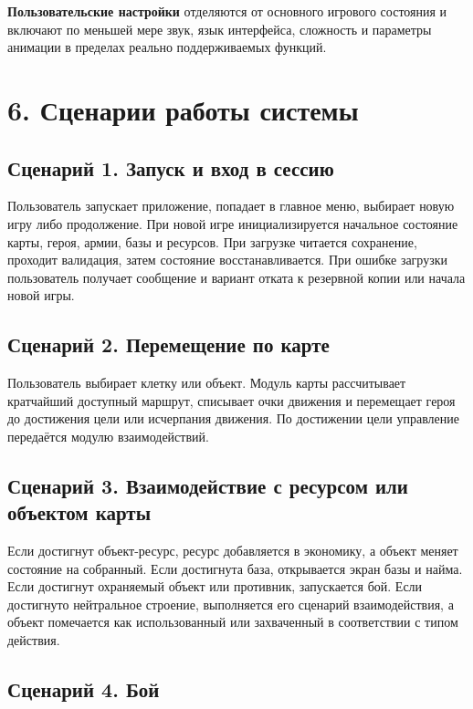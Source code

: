 \documentclass[12pt,a4paper]{article}
\begin{document}
\textbf{Пользовательские настройки} отделяются от основного игрового состояния и включают по меньшей мере звук, язык интерфейса, сложность и параметры анимации в пределах реально поддерживаемых функций.

\section*{6. Сценарии работы системы}

\subsection*{Сценарий 1. Запуск и вход в сессию}

Пользователь запускает приложение, попадает в главное меню, выбирает новую игру либо продолжение. При новой игре инициализируется начальное состояние карты, героя, армии, базы и ресурсов. При загрузке читается сохранение, проходит валидация, затем состояние восстанавливается. При ошибке загрузки пользователь получает сообщение и вариант отката к резервной копии или начала новой игры.

\subsection*{Сценарий 2. Перемещение по карте}

Пользователь выбирает клетку или объект. Модуль карты рассчитывает кратчайший доступный маршрут, списывает очки движения и перемещает героя до достижения цели или исчерпания движения. По достижении цели управление передаётся модулю взаимодействий.

\subsection*{Сценарий 3. Взаимодействие с ресурсом или объектом карты}

Если достигнут объект-ресурс, ресурс добавляется в экономику, а объект меняет состояние на собранный. Если достигнута база, открывается экран базы и найма. Если достигнут охраняемый объект или противник, запускается бой. Если достигнуто нейтральное строение, выполняется его сценарий взаимодействия, а объект помечается как использованный или захваченный в соответствии с типом действия.

\subsection*{Сценарий 4. Бой}
\end{document}
